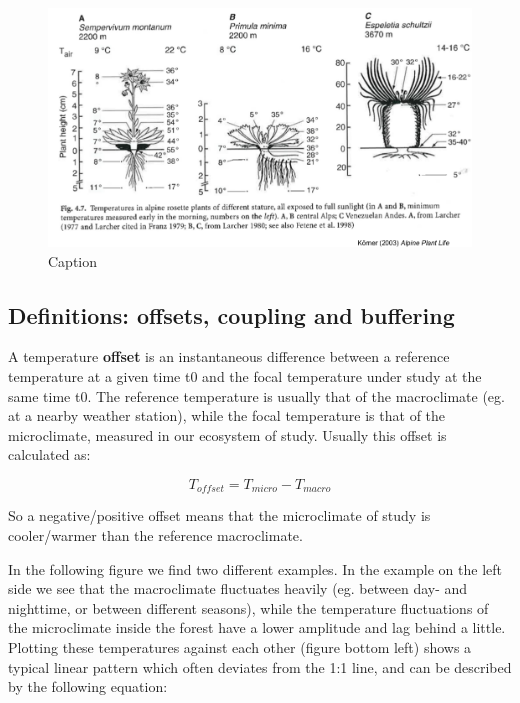 \documentclass[12pt,oneside]{book}
\begin{document}
\begin{figure}

{\centering \includegraphics[width=1\linewidth]{figures/Figure105} 

}

\caption{Caption}\label{fig:Micro5}
\end{figure}

\subsection{Definitions: offsets, coupling and
buffering}\label{definitions-offsets-coupling-and-buffering}

A temperature \textbf{offset} is an instantaneous difference between a
reference temperature at a given time t0 and the focal temperature under
study at the same time t0. The reference temperature is usually that of
the macroclimate (eg. at a nearby weather station), while the focal
temperature is that of the microclimate, measured in our ecosystem of
study. Usually this offset is calculated as:

\begin{equation} 
 T_{offset} = T_{micro} - T_{macro}
  \label{eq:EqMicro1}
\end{equation}

So a negative/positive offset means that the microclimate of study is
cooler/warmer than the reference macroclimate.

In the following figure we find two different examples. In the example
on the left side we see that the macroclimate fluctuates heavily (eg.
between day- and nighttime, or between different seasons), while the
temperature fluctuations of the microclimate inside the forest have a
lower amplitude and lag behind a little. Plotting these temperatures
against each other (figure bottom left) shows a typical linear pattern
which often deviates from the 1:1 line, and can be described by the
following equation:
\end{document}
